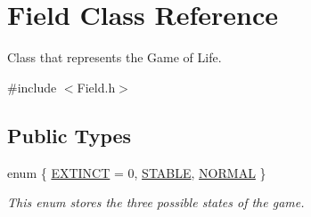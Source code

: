 \hypertarget{classField}{}\section{Field Class Reference}
\label{classField}


Class that represents the Game of Life.  




{\ttfamily \#include $<$Field.\+h$>$}

\subsection*{Public Types}
\begin{DoxyCompactItemize}
\item 
enum \{ \hyperlink{classField_aa6d508a405365e5a6c0414885e525f0ca56fae498f50c63150db6f0a62f5e1fca}{E\+X\+T\+I\+N\+CT} = 0, 
\hyperlink{classField_aa6d508a405365e5a6c0414885e525f0cabbd2d19da019f8f32b0996513f0a3bf6}{S\+T\+A\+B\+LE}, 
\hyperlink{classField_aa6d508a405365e5a6c0414885e525f0ca4b7abbee7590e23286d7583cb23e24ee}{N\+O\+R\+M\+AL}
 \}\begin{DoxyCompactList}\small\item\em This enum stores the three possible states of the game. \end{DoxyCompactList}
\end{DoxyCompactItemize}
